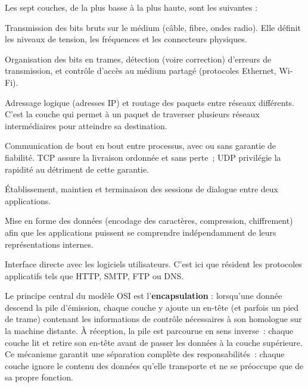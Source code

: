 Les sept couches, de la plus basse à la plus haute, sont les suivantes :

\begin{description}[leftmargin=2.5cm, labelwidth=2.2cm, style=nextline]
  \item[\textbf{Couche~1 Physique}]
    Transmission des bits bruts sur le médium (câble, fibre, ondes radio). Elle définit
    les niveaux de tension, les fréquences et les connecteurs physiques.

  \item[\textbf{Couche~2 Liaison}]
    Organisation des bits en trames, détection (voire correction) d'erreurs de
    transmission, et contrôle d'accès au médium partagé (protocoles Ethernet, Wi-Fi).

  \item[\textbf{Couche~3 Réseau}]
    Adressage logique (adresses IP) et routage des paquets entre réseaux différents.
    C'est la couche qui permet à un paquet de traverser plusieurs réseaux intermédiaires
    pour atteindre sa destination.

  \item[\textbf{Couche~4 Transport}]
    Communication de bout en bout entre processus, avec ou sans garantie de fiabilité.
    TCP assure la livraison ordonnée et sans perte~; UDP privilégie la rapidité au
    détriment de cette garantie.

  \item[\textbf{Couche~5 Session}]
    Établissement, maintien et terminaison des sessions de dialogue entre deux
    applications.

  \item[\textbf{Couche~6 Présentation}]
    Mise en forme des données (encodage des caractères, compression, chiffrement) afin
    que les applications puissent se comprendre indépendamment de leurs représentations
    internes.

  \item[\textbf{Couche~7 Application}]
    Interface directe avec les logiciels utilisateurs. C'est ici que résident les
    protocoles applicatifs tels que HTTP, SMTP, FTP ou DNS.
\end{description}

Le principe central du modèle OSI est l'\textbf{encapsulation} : lorsqu'une donnée
descend la pile d'émission, chaque couche y ajoute un en-tête (et parfois un pied de
trame) contenant les informations de contrôle nécessaires à son homologue sur la machine
distante. À réception, la pile est parcourue en sens inverse~: chaque couche lit et retire
son en-tête avant de passer les données à la couche supérieure. Ce mécanisme garantit une
séparation complète des responsabilités~: chaque couche ignore le contenu des données
qu'elle transporte et ne se préoccupe que de sa propre fonction.

